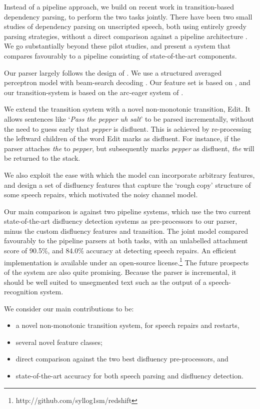 \documentclass[11pt,letterpaper]{article}
\begin{document}
Instead of a pipeline approach, we build on recent work in transition-based dependency
parsing, to perform the two tasks jointly.
There have been two small studies of dependency parsing on unscripted speech,
both using entirely greedy parsing strategies, without a direct comparison
against a pipeline architecture \citep{jorgensen:07,rasooli:13}.  We go substantially
beyond these pilot studies, and present a system that compares favourably to a
pipeline consisting of state-of-the-art components.

Our parser largely follows the design of \citet{zhang:cl11}. We use a structured averaged
perceptron model with beam-search decoding \citep{collins:02}. Our feature set
is based on \citet{zhang:cl11}, and our transition-system is based on the arc-eager
system of \citet{nivre:03}.

We extend the transition system with a novel non-monotonic transition, Edit.
It allows sentences like `\emph{Pass the pepper uh salt}'
to be parsed incrementally, without the need to guess early that \emph{pepper}
is disfluent.  This is achieved by re-processing the leftward children of
the word Edit marks as disfluent.  For instance, if the parser attaches \emph{the}
to \emph{pepper}, but subsequently marks \emph{pepper} as disfluent, \emph{the} will
be returned to the stack.

We also exploit the ease with which the model can incorporate arbitrary
features, and design a set of disfluency features that capture the
`rough copy' structure of some speech repairs, which motivated the
\citet{Johnson04a} noisy channel model.

Our main comparison is against two pipeline systems, which use the two current 
state-of-the-art disfluency detection systems as pre-processors to our
parser, minus the custom disfluency features and transition.
The joint model compared favourably to the pipeline parsers at both tasks, with
an unlabelled attachment score of 90.5\%, and 84.0\% accuracy at detecting speech
repairs. An efficient implementation is available under an open-source
license.\footnote{http://github.com/syllog1sm/redshift}
The future prospects of the system are also quite promising.
Because the parser is incremental, it should be well suited to
unsegmented text such as the output of a speech-recognition system.

We consider our main contributions to be:

\begin{itemize}
    \itemsep0em
    \item a novel non-monotonic transition system, for speech repairs and restarts,
    \item several novel feature classes;
    \item direct comparison against the two best disfluency pre-processors, and
    \item state-of-the-art accuracy for both speech parsing and disfluency detection.
\end{itemize}
\end{document}
